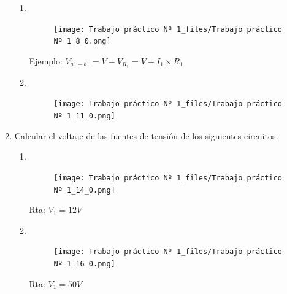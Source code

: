 \documentclass[10pt,a4paper]{article}
\begin{document}
\begin{enumerate}
\begin{enumerate}
	
\item  \

	\begin{figure}[H]
		\centering
		\texttt{[image: Trabajo práctico Nº 1\_files/Trabajo práctico Nº 		1\_8\_0.png]}

		\label{e3a}
	\end{figure}

Ejemplo: \(V_{a1-b1}=V-V_{R_1}=V-I_1 \times R_1\)


\item \

\begin{figure}[H]
	\centering
	\texttt{[image: Trabajo práctico Nº 1\_files/Trabajo práctico Nº 1\_11\_0.png]}

	\label{e3b}
\end{figure}

\end{enumerate}




\item Calcular el voltaje de las fuentes de tensión de los siguientes circuitos.

\begin{enumerate}
	
	\item \
	
\begin{figure}[H]
	\centering
	\texttt{[image: Trabajo práctico Nº 1\_files/Trabajo práctico Nº 1\_14\_0.png]}
	\label{e4a}
\end{figure}
    
Rta: \(V_1=12V\)

\item \

\begin{figure}[H]
	\centering
	\texttt{[image: Trabajo práctico Nº 1\_files/Trabajo práctico Nº 1\_16\_0.png]}

	\label{e4b}
	
\end{figure}
Rta: \(V_1=50V\)

\end{enumerate}


\end{enumerate}
\end{document}
